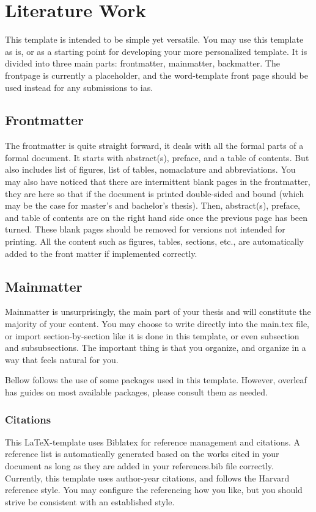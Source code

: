 \section{Literature Work}

This template is intended to be simple yet versatile. You may use this template as is, or as a starting point for developing your more personalized template. It is divided into three main parts: frontmatter, mainmatter, backmatter. The frontpage is currently a placeholder, and the word-template front page should be used instead for any submissions to \acrshort{ias}.

\subsection{Frontmatter}
The frontmatter is quite straight forward, it deals with all the formal parts of a formal document.  It starts with abstract(s), preface, and a table of contents. But also includes list of figures, list of tables, nomaclature and abbreviations. You may also have noticed that there are intermittent blank pages in the frontmatter, they are here so that if the document is printed double-sided and bound (which may be the case for master's and bachelor's thesis). Then, abstract(s), preface, and table of contents are on the right hand side once the previous page has been turned. These blank pages should be removed for versions not intended for printing. All the content such as figures, tables, sections, etc., are automatically added to the front matter if implemented correctly.

\subsection{Mainmatter}

Mainmatter is unsurprisingly, the main part of your thesis and will constitute the majority of your content. You may choose to write directly into the main.tex file, or import section-by-section like it is done in this template, or even subsection and subsubsections. The important thing is that you organize, and organize in a way that feels natural for you. 

Bellow follows the use of some packages used in this template. However, overleaf has guides on most available packages, please consult them as needed.

\subsubsection{Citations}
This \LaTeX-template uses Biblatex for reference management and citations. A reference list is automatically generated based on the works cited in your document as long as they are added in your references.bib file correctly. Currently, this template uses author-year citations, and follows the Harvard reference style. You may configure the referencing how you like, but you should strive be consistent with an established style.


